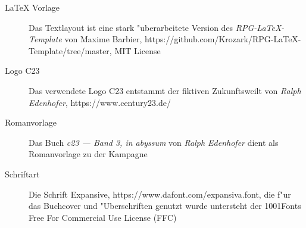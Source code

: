 \newpage
\pagestyle{empty}


\begin{description}
    \item [LaTeX Vorlage] Das Textlayout ist eine stark "uberarbeitete Version des \textit{RPG-LaTeX-Template} von 
        Maxime Barbier, https://github.com/Krozark/RPG-LaTeX-Template/tree/master, MIT License
    \item [Logo C23] Das verwendete Logo C23 entstammt der fiktiven Zukunftsweilt von \emph{Ralph  Edenhofer}, 
        \newline{}https://www.century23.de/
    \item [Romanvorlage] Das Buch \emph{c23 --- Band 3, in abyssum} von \emph{Ralph  Edenhofer} dient als Romanvorlage 
        zu der Kampagne
    \item [Schriftart] Die Schrift Expansive, https://www.dafont.com/expansiva.font, die f"ur das Buchcover und 
        "Uberschriften genutzt wurde untersteht der 1001Fonts Free For Commercial Use License (FFC)    
\end{description}